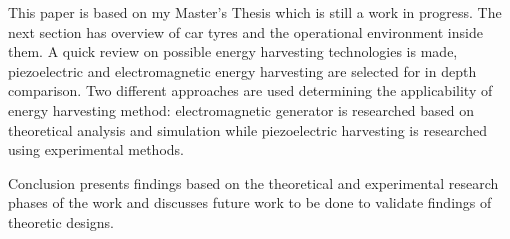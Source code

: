This paper is based on my Master's Thesis which is still a work in progress. The next section has overview of car tyres and the operational environment inside them. A quick review on possible energy harvesting technologies is made, piezoelectric and electromagnetic energy harvesting are selected for in depth comparison. Two different approaches are used determining the applicability of energy harvesting method: electromagnetic generator is researched based on theoretical analysis and simulation while piezoelectric harvesting is researched using experimental methods.

Conclusion presents findings based on the theoretical and experimental research phases of the work and discusses future work to be done to validate findings of theoretic designs. 

